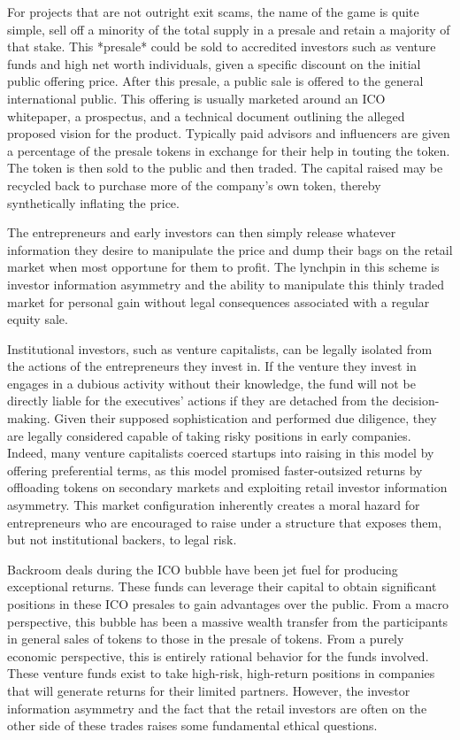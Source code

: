 For projects that are not outright exit scams, the name of the game is quite
simple, sell off a minority of the total supply in a presale and retain a
majority of that stake. This *presale* could be sold to accredited investors
such as venture funds and high net worth individuals, given a specific discount
on the initial public offering price. After this presale, a public sale is
offered to the general international public. This offering is usually marketed
around an ICO whitepaper, a prospectus, and a technical document outlining the
alleged proposed vision for the product. Typically paid advisors and influencers
are given a percentage of the presale tokens in exchange for their help in
touting the token. The token is then sold to the public and then traded. The
capital raised may be recycled back to purchase more of the company's own token,
thereby synthetically inflating the price.


The entrepreneurs and early investors can then simply release whatever
information they desire to manipulate the price and dump their bags on the
retail market when most opportune for them to profit. The lynchpin in this
scheme is investor information asymmetry and the ability to manipulate this
thinly traded market for personal gain without legal consequences associated
with a regular equity sale. \cite{boreiko2020serial}

Institutional investors, such as venture capitalists, can be legally isolated
from the actions of the entrepreneurs they invest in. If the venture they invest
in engages in a dubious activity without their knowledge, the fund will not be
directly liable for the executives' actions if they are detached from the
decision-making. Given their supposed sophistication and performed due
diligence, they are legally considered capable of taking risky positions in
early companies. Indeed, many venture capitalists coerced startups into raising
in this model by offering preferential terms, as this model promised
faster-outsized returns by offloading tokens on secondary markets and exploiting
retail investor information asymmetry. This market configuration inherently
creates a moral hazard for entrepreneurs who are encouraged to raise under a
structure that exposes them, but not institutional backers, to legal risk.

Backroom deals during the ICO bubble have been jet fuel for producing
exceptional returns. These funds can leverage their capital to obtain
significant positions in these ICO presales to gain advantages over the public.
From a macro perspective, this bubble has been a massive wealth transfer from
the participants in general sales of tokens to those in the presale of tokens.
From a purely economic perspective, this is entirely rational behavior for the
funds involved. These venture funds exist to take high-risk, high-return
positions in companies that will generate returns for their limited partners.
However, the investor information asymmetry and the fact that the retail
investors are often on the other side of these trades raises some fundamental
ethical questions.

